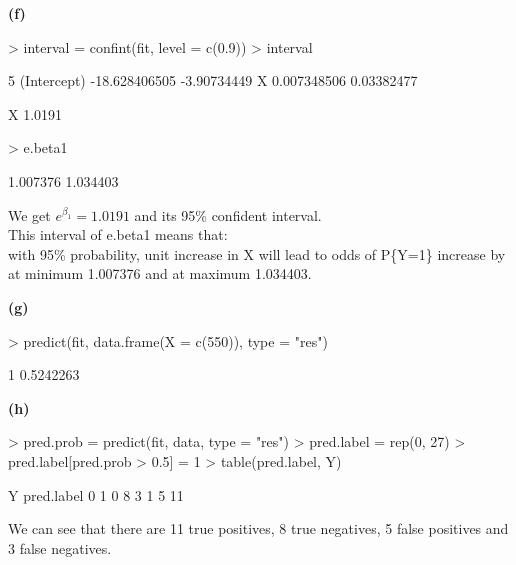 \documentclass[a4paper]{article}
\renewcommand{\part}[1] {\vspace{.10in} {\bf (#1)}}
\begin{document}
\part{f}
\begin{Schunk}
\begin{Sinput}
> interval = confint(fit, level = c(0.9))
> interval
\end{Sinput}
\begin{Soutput}
                      5 %
(Intercept) -18.628406505 -3.90734449
X             0.007348506  0.03382477
\end{Soutput}
\begin{Soutput}
     X 
1.0191 
\end{Soutput}
\begin{Sinput}
> e.beta1
\end{Sinput}
\begin{Soutput}
[1] 1.007376 1.034403
\end{Soutput}
\end{Schunk}
{\color{red}
We get $e^{\beta_1} = 1.0191$ and its 95\% confident interval.\\
This interval of e.beta1 means that: \\
with 95\% probability, unit increase in X will lead to odds of P\{Y=1\} increase by at minimum 1.007376 and at maximum 1.034403.
}

\part{g}
\begin{Schunk}
\begin{Sinput}
> predict(fit, data.frame(X = c(550)), type = "res")
\end{Sinput}
\begin{Soutput}
        1 
0.5242263 
\end{Soutput}
\end{Schunk}


\part{h}
\begin{Schunk}
\begin{Sinput}
> pred.prob = predict(fit, data, type = "res")
> pred.label = rep(0, 27)
> pred.label[pred.prob > 0.5] = 1
> table(pred.label, Y)
\end{Sinput}
\begin{Soutput}
          Y
pred.label  0  1
         0  8  3
         1  5 11
\end{Soutput}
\end{Schunk}
{\color{red}
We can see that there are 11 true positives, 8 true negatives, 5 false positives and 3 false negatives.
}
\end{document}

